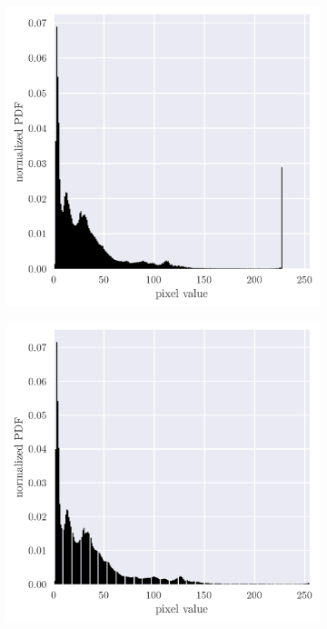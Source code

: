 \documentclass[12pt,a4paper]{article}
\begin{document}
\begin{figure}[htb]
	\begin{subfigure}[h!]{0.24\textwidth}
		\centering
		\includegraphics[width=\textwidth]{orig_hist.png}
		\caption{}
		\label{fig:orig-hist}
	\end{subfigure}
	\begin{subfigure}[h!]{0.24\textwidth}
		\centering
		\includegraphics[width=\textwidth]{cs_hist.png}

\end{subfigure}
\end{figure}
\end{document}
